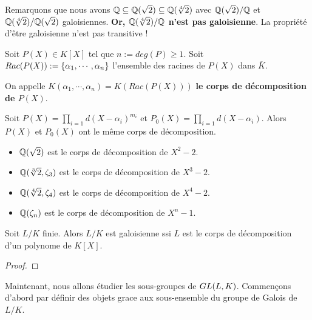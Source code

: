 Remarquons que nous avons $\mathbb{Q} \subseteq \mathbb{Q}(\sqrt{2}) \subseteq
\mathbb{Q}(\sqrt[4]{2})$ avec $\mathbb{Q}(\sqrt{2})/\mathbb{Q}$ et
$\mathbb{Q}(\sqrt[4]{2})/\mathbb{Q}(\sqrt{2})$ galoisiennes.
\textbf{Or, $\mathbb{Q}(\sqrt[4]{2})/\mathbb{Q}$ n'est pas galoisienne}. La
propriété d'être galoisienne n'est pas transitive !

\begin{definition}
	Soit $P(X) \in K[X]$ tel que $n := deg(P) \geq 1$. Soit $Rac(P(X)) :=
	\left\{ \alpha_{1}, \cdots, \alpha_{n} \right\}$ l'ensemble
	des racines de $P(X)$ dans $\overline{K}$.

	On appelle $K(\alpha_{1}, \cdots, \alpha_{n}) = K(Rac(P(X)))$ \textbf{le
	corps de décomposition de $P(X)$}.
\end{definition}

\begin{remarque}
	Soit $P(X) = \displaystyle \prod_{i = 1}{d} (X - \alpha_{i})^{m_{i}}$ et
	$P_{0}(X) = \displaystyle \prod_{i = 1}{d} (X - \alpha_{i})$. Alors $P(X)$
	et $P_{0}(X)$ ont le même corps de décomposition.
\end{remarque}

\begin{exemple}
	\begin{itemize}
		\item $\mathbb{Q}(\sqrt{2})$ est le corps de décomposition de $X^{2} -
			2$.
		\item $\mathbb{Q}(\sqrt[3]{2}, \zeta_{3})$ est le corps de décomposition
			de $X^{3} - 2$.
		\item $\mathbb{Q}(\sqrt[4]{2}, \zeta_{4})$ est le corps de décomposition
			de $X^{4} - 2$.
		\item $\mathbb{Q}(\zeta_{n})$ est le corps de décomposition de $X^{n} -
			1$.
	\end{itemize}
\end{exemple}

\begin{proposition}
	Soit $L/K$ finie. Alors $L/K$ est galoisienne ssi $L$ est le corps de
	décomposition d'un polynome de $K[X]$.
\end{proposition}

\ifdefined\outputproof
\begin{proof}

\end{proof}
\fi

Maintenant, nous allons étudier les sous-groupes de $GL(L, K)$.
Commençons d'abord par définir des objets grace aux sous-ensemble du groupe de
Galois de $L/K$.

